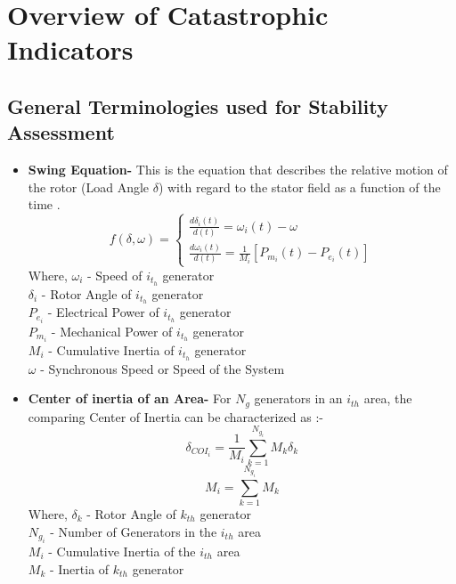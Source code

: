 \chapter{Overview of Catastrophic Indicators}

\section{General Terminologies used for Stability Assessment}
\begin{itemize}
\item \textbf{Swing Equation-}
This is the equation that describes the relative motion of the rotor (Load Angle $\delta$) with regard to the stator field as a function of the time \cite{7}.
\begin{equation}
f(\delta,\omega)=\begin{cases}
\frac{d\delta_i (t)}{d(t)} = \omega_i (t) - \omega \\
\frac{d\omega_i (t)}{d(t)} = \frac{1}{M_i}[P_{m_i} (t) - P_{e_i} (t)]
\end{cases}
\end{equation}
Where, \hspace{0.7 cm}\(\omega_i\) - Speed of \(i_{t_h}\) generator\\
\tab\tab \(\delta_i\) - Rotor Angle of \(i_{t_h}\) generator
\\\tab\tab \(P_{e_i}\) - Electrical Power of \(i_{t_h}\) generator
\\\tab\tab \(P_{m_i}\) - Mechanical Power of \(i_{t_h}\) generator
\\\tab\tab \(M_i\) - Cumulative Inertia of \(i_{t_h}\) generator
\\\tab\tab \(\omega\) - Synchronous Speed or Speed of the System

\item \textbf{Center of inertia of an Area-}
For \(N_g\) generators in an \(i_{th}\) area, the comparing Center of Inertia can be characterized as \cite{8}:-
\begin{equation}
\delta_{COI_i} = \frac{1}{M_i} \sum_{k=1}^{N_{g_i}} M_k \delta_k
\end{equation}\begin{equation}
M_i = \sum_{k=1}^{N_{g_i}} M_k 
\end{equation}
Where,\hspace{0.75 cm} \(\delta_k\) - Rotor Angle of \(k_{th}\) generator
\\\tab\tab \(N_{g_i}\) - Number of Generators in the \(i_{th}\) area
\\\tab\tab \(M_i\) - Cumulative Inertia of the \(i_{th}\) area
\\\tab\tab \(M_k\) - Inertia of \(k_{th}\) generator


\end{itemize}

